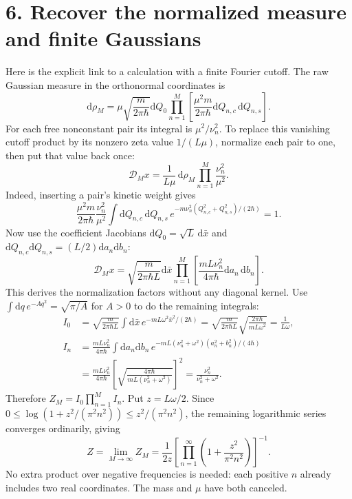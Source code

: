 \documentclass[11pt,letterpaper]{article}
\newcommand{\dd}{\mathrm{d}}
\begin{document}
\section*{6. Recover the normalized measure and finite Gaussians}
Here is the explicit link to a calculation with a finite Fourier cutoff.
The raw Gaussian measure in the orthonormal coordinates is
\[
 \dd\rho_M=\mu\sqrt{\frac{m}{2\pi\hbar}}\dd Q_0
 \prod_{n=1}^M\left[\frac{\mu^2m}{2\pi\hbar}\dd Q_{n,c}\,\dd Q_{n,s}\right].
\]
For each free nonconstant pair its integral is $\mu^2/\nu_n^2$.
To replace this vanishing cutoff product by its nonzero zeta value $1/(L\mu)$,
normalize each pair to one, then put that value back once:
\begin{equation}
 \mathcal D_Mx=\frac{1}{L\mu}\,\dd\rho_M
                 \prod_{n=1}^M\frac{\nu_n^2}{\mu^2}.
 \label{eq:cutoff-measure}
\end{equation}
Indeed, inserting a pair's kinetic weight gives
\[
 \frac{\mu^2m}{2\pi\hbar}\frac{\nu_n^2}{\mu^2}
 \int\dd Q_{n,c}\,\dd Q_{n,s}\,
 e^{-m\nu_n^2(Q_{n,c}^2+Q_{n,s}^2)/(2\hbar)}=1.
\]
Now use the coefficient Jacobians
$\dd Q_0=\sqrt L\,\dd\bar x$ and
$\dd Q_{n,c}\dd Q_{n,s}=(L/2)\dd a_n\dd b_n$:
\begin{equation}
 \boxed{\mathcal D_Mx=\sqrt{\frac{m}{2\pi\hbar L}}\dd\bar x
 \prod_{n=1}^M\left[\frac{mL\nu_n^2}{4\pi\hbar}\dd a_n\,\dd b_n\right].}
 \label{eq:measure}
\end{equation}
This derives the normalization factors without any diagonal kernel.
Use $\int\dd q\,e^{-Aq^2}=\sqrt{\pi/A}$ for $A>0$ to do the remaining integrals:
\begin{align}
 I_0&=\sqrt{\frac{m}{2\pi\hbar L}}
 \int\dd\bar x\,e^{-mL\omega^2\bar x^2/(2\hbar)}
 =\sqrt{\frac{m}{2\pi\hbar L}}\sqrt{\frac{2\pi\hbar}{mL\omega^2}}
 =\frac1{L\omega},\\
 I_n&=\frac{mL\nu_n^2}{4\pi\hbar}
 \int\dd a_n\dd b_n\,e^{-mL(\nu_n^2+\omega^2)(a_n^2+b_n^2)/(4\hbar)}\\
 &=\frac{mL\nu_n^2}{4\pi\hbar}
 \left[\sqrt{\frac{4\pi\hbar}{mL(\nu_n^2+\omega^2)}}\right]^2
 =\frac{\nu_n^2}{\nu_n^2+\omega^2}.
\end{align}
Therefore $Z_M=I_0\prod_{n=1}^MI_n$.
Put $z=L\omega/2$. Since
$0\leq\log(1+z^2/(\pi^2n^2))\leq z^2/(\pi^2n^2)$,
the remaining logarithmic series converges ordinarily, giving
\begin{equation}
 Z=\lim_{M\to\infty}Z_M
 =\frac{1}{2z}\left[\prod_{n=1}^{\infty}
             \left(1+\frac{z^2}{\pi^2n^2}\right)\right]^{-1}.
 \label{eq:product-Z}
\end{equation}
No extra product over negative frequencies is needed: each positive $n$
already includes two real coordinates. The mass and $\mu$ have both canceled.
\end{document}
